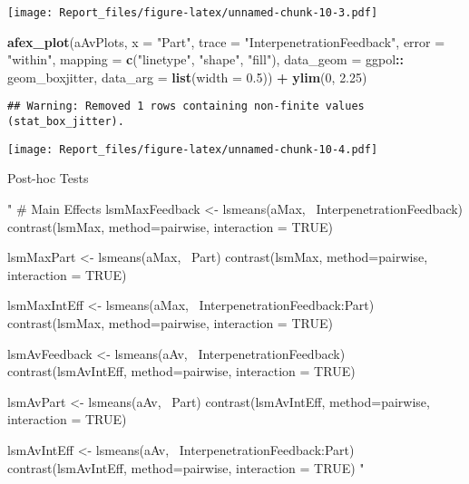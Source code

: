\documentclass[
]{article}
\newenvironment{Shaded}{\begin{snugshade}}{\end{snugshade}}
\newcommand{\DataTypeTok}[1]{\textcolor[rgb]{0.13,0.29,0.53}{#1}}
\newcommand{\DecValTok}[1]{\textcolor[rgb]{0.00,0.00,0.81}{#1}}
\newcommand{\FloatTok}[1]{\textcolor[rgb]{0.00,0.00,0.81}{#1}}
\newcommand{\KeywordTok}[1]{\textcolor[rgb]{0.13,0.29,0.53}{\textbf{#1}}}
\newcommand{\NormalTok}[1]{#1}
\newcommand{\OperatorTok}[1]{\textcolor[rgb]{0.81,0.36,0.00}{\textbf{#1}}}
\newcommand{\StringTok}[1]{\textcolor[rgb]{0.31,0.60,0.02}{#1}}
\begin{document}
\texttt{[image: Report\_files/figure-latex/unnamed-chunk-10-3.pdf]}

\begin{Shaded}
\begin{Highlighting}[]
\KeywordTok{afex_plot}\NormalTok{(aAvPlots, }\DataTypeTok{x =} \StringTok{"Part"}\NormalTok{, }\DataTypeTok{trace =} \StringTok{"InterpenetrationFeedback"}\NormalTok{, }\DataTypeTok{error =} \StringTok{"within"}\NormalTok{, }
                \DataTypeTok{mapping =} \KeywordTok{c}\NormalTok{(}\StringTok{"linetype"}\NormalTok{, }\StringTok{"shape"}\NormalTok{, }\StringTok{"fill"}\NormalTok{),}
                \DataTypeTok{data_geom =}\NormalTok{ ggpol}\OperatorTok{::}\StringTok{ }\NormalTok{geom_boxjitter, }
                \DataTypeTok{data_arg =} \KeywordTok{list}\NormalTok{(}\DataTypeTok{width =} \FloatTok{0.5}\NormalTok{))  }\OperatorTok{+}
\StringTok{            }\KeywordTok{ylim}\NormalTok{(}\DecValTok{0}\NormalTok{, }\FloatTok{2.25}\NormalTok{)}
\end{Highlighting}
\end{Shaded}

\begin{verbatim}
## Warning: Removed 1 rows containing non-finite values (stat_box_jitter).
\end{verbatim}

\texttt{[image: Report\_files/figure-latex/unnamed-chunk-10-4.pdf]}

Post-hoc Tests

\begin{Shaded}
\begin{Highlighting}[]
\StringTok{"}
\StringTok{# Main Effects}
\StringTok{lsmMaxFeedback <- lsmeans(aMax,~ InterpenetrationFeedback)}
\StringTok{contrast(lsmMax, method=pairwise, interaction = TRUE)}

\StringTok{lsmMaxPart <- lsmeans(aMax,~ Part)}
\StringTok{contrast(lsmMax, method=pairwise, interaction = TRUE)}

\StringTok{lsmMaxIntEff <- lsmeans(aMax,~ InterpenetrationFeedback:Part)}
\StringTok{contrast(lsmMax, method=pairwise, interaction = TRUE)}

\StringTok{lsmAvFeedback <- lsmeans(aAv,~ InterpenetrationFeedback)}
\StringTok{contrast(lsmAvIntEff, method=pairwise, interaction = TRUE)}

\StringTok{lsmAvPart <- lsmeans(aAv,~ Part)}
\StringTok{contrast(lsmAvIntEff, method=pairwise, interaction = TRUE)}

\StringTok{lsmAvIntEff <- lsmeans(aAv,~ InterpenetrationFeedback:Part)}
\StringTok{contrast(lsmAvIntEff, method=pairwise, interaction = TRUE)}
\StringTok{"}
\end{Highlighting}
\end{Shaded}
\end{document}
